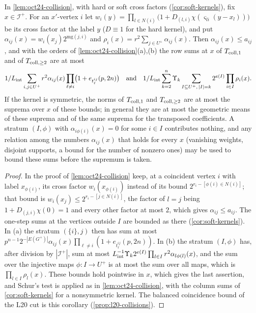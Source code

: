 \begin{corollary}\label{cor:incident-weights}
In \cref{lem:oct24-collision}, with hard or soft cross factors
(\cref{cor:soft-kernels}), fix $x\in\mathcal I^+$. For an $x'$-vertex $i$ let
$w_i(y)=\prod_{l\in N(i)}\bigl(1+D_{(l,i)}\chi(\varsigma_{li}(y-x_l))\bigr)$ be its cross
factor at the label $y$ ($D\equiv1$ for the hard kernel), and put
$\alpha_{ij}(x)=w_i(x_j)2^{\mathrm{mg}(j,i)}$ and
$\rho_i(x)=r^2\sum_{j\in U^+}\alpha_{ij}(x)$. Then $\alpha_{ij}(x)\le a_{ij}$, and with the
orders of \cref{lem:oct24-collision}(a),(b) the row sums at $x$ of $T_{\rm coll,1}$
and of $T_{\rm coll,\ge2}$ are at most
\[
 \frac1{L_{\rm int}}\sum_{i,j\in U^+}r^2\alpha_{ij}(x)
 \prod_{\ell\ne i}\bigl(1+e_{t^{ij}_\ell}(p,2n)\bigr)
 \quad\text{and}\quad
 \frac1{L_{\rm int}}\sum_{k=2}^n\Upsilon_k\sum_{I\subseteq U^+,\,|I|=k}2^{e(I)}
 \prod_{i\in I}\rho_i(x).
\]
If the kernel is symmetric, the norms of $T_{\rm coll,1}$ and $T_{\rm coll,\ge2}$ are
at most the suprema over $x$ of these bounds; in general they are at most the
geometric means of these suprema and of the same suprema for the transposed
coefficients. A stratum $(I,\phi)$ with $\alpha_{i\phi(i)}(x)=0$ for some $i\in I$
contributes nothing, and any relation among the numbers $\alpha_{ij}(x)$ that holds for
every $x$ (vanishing weights, disjoint supports, a bound for the number of nonzero
ones) may be used to bound these sums before the supremum is taken.
\end{corollary}

\begin{proof}
In the proof of \cref{lem:oct24-collision} keep, at a coincident vertex $i$ with
label $x_{\phi(i)}$, its cross factor $w_i(x_{\phi(i)})$ instead of its bound
$2^{r_i-[\phi(i)\in N(i)]}$; that bound is $w_i(x_j)\le2^{r_i-[j\in N(i)]}$, the factor
of $l=j$ being $1+D_{(j,i)}\chi(0)=1$ and every other factor at most $2$, which gives
$\alpha_{ij}\le a_{ij}$. The one-step sums at the vertices outside $I$ are bounded as there
(\cref{cor:soft-kernels}). In (a) the stratum $(\{i\},j)$ then has sum at most
$p^{n-1}2^{-|E(G^+)|}\alpha_{ij}(x)\prod_{\ell\ne i}(1+e_{t^{ij}_\ell}(p,2n))$. In (b)
the stratum $(I,\phi)$ has, after division by $|\mathcal I^+|$, sum at most
$L_{\rm int}^{-1}\Upsilon_k2^{e(I)}\prod_{l\in I}r^2\alpha_{l\phi(l)}(x)$, and the sum
over the injective maps $\phi\colon I\to U^+$ is at most the sum over all maps, which
is $\prod_{l\in I}\rho_l(x)$. These bounds hold pointwise in $x$, which gives the last
assertion, and Schur's test is applied as in \cref{lem:oct24-collision}, with the
column sums of \cref{cor:soft-kernels} for a nonsymmetric kernel. The balanced
coincidence bound of the L20 cut is this corollary (\cref{prop:l20-collisions}).
\end{proof}

